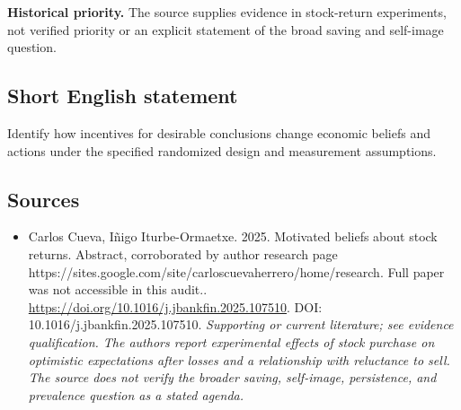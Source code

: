 \documentclass[11pt]{article}
\begin{document}
\par\textbf{Historical priority.} The source supplies evidence in stock-return experiments, not verified priority or an explicit statement of the broad saving and self-image question.

\subsection{Short English statement}
Identify how incentives for desirable conclusions change economic beliefs and actions under the specified randomized design and measurement assumptions.

\subsection{Sources}
\begin{itemize}\raggedright
\item[\textnormal{[S1]}]\hypertarget{source:30007587:1}{} Carlos Cueva, Iñigo Iturbe-Ormaetxe. 2025. Motivated beliefs about stock returns. Abstract, corroborated by author research page https://sites.google.com/site/carloscuevaherrero/home/research. Full paper was not accessible in this audit..
\url{https://doi.org/10.1016/j.jbankfin.2025.107510}.
DOI: 10.1016/j.jbankfin.2025.107510.
{\small\textit{Supporting or current literature; see evidence qualification. The authors report experimental effects of stock purchase on optimistic expectations after losses and a relationship with reluctance to sell. The source does not verify the broader saving, self-image, persistence, and prevalence question as a stated agenda.}}
\end{itemize}
\end{document}
